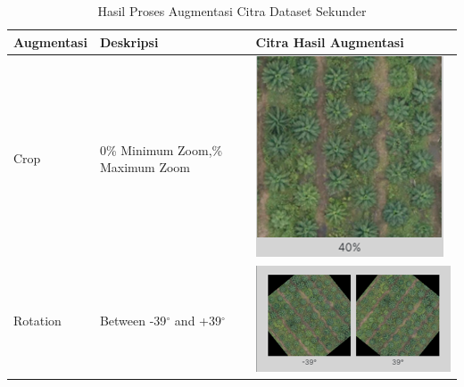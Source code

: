 \begin{singlespace}
	\begin{table}[H]
		\centering
		\caption{Hasil Proses Augmentasi Citra Dataset Sekunder}
		\label{tbl:Hasil-Proses-Augmentasi-Citra-Dataset-Sekunder}
		\begin{tabular}{|p{3cm}|p{3cm}|p{6cm}|}
			\hline
			\rowcolor[HTML]{D9D9D9} 
			Augmentasi & Deskripsi                                                                & Citra Hasil Augmentasi \\ \hline
			
			
			Crop & 0\% Minimum Zoom,\newline 40\% Maximum Zoom & \includegraphics[width=0.4\columnwidth]{bab4/Gambar/tbl-5-pic1.png}\\ \hline
			
			Rotation & Between -39$^{\circ}$ and +39$^{\circ}$ & \includegraphics[width=0.4\columnwidth]{bab4/Gambar/tbl-5-pic2.png}\\ \hline
		\end{tabular}
	\end{table}
\end{singlespace}

